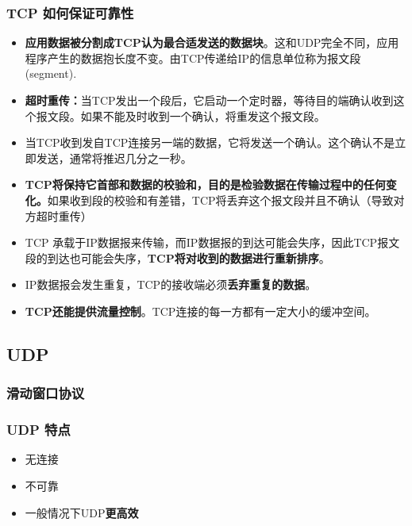 \documentclass[UTF8,a4paper,8pt]{ctexbook}
\begin{document}
			\subsubsection{TCP 如何保证可靠性}
				\begin{itemize}
					\item \textbf{应用数据被分割成TCP认为最合适发送的数据块}。这和UDP完全不同，应用程序产生的数据抱长度不变。由TCP传递给IP的信息单位称为报文段(segment).
					
					\item \textbf{超时重传：}当TCP发出一个段后，它启动一个定时器，等待目的端确认收到这个报文段。如果不能及时收到一个确认，将重发这个报文段。
					
					\item 当TCP收到发自TCP连接另一端的数据，它将发送一个确认。这个确认不是立即发送，通常将推迟几分之一秒。
					
					\item \textbf{TCP将保持它首部和数据的校验和，目的是检验数据在传输过程中的任何变化。}如果收到段的校验和有差错，TCP将丢弃这个报文段并且不确认（导致对方超时重传） 
					
					\item TCP 承载于IP数据报来传输，而IP数据报的到达可能会失序，因此TCP报文段的到达也可能会失序，\textbf{TCP将对收到的数据进行重新排序}。
					
					\item IP数据报会发生重复，TCP的接收端必须\textbf{丢弃重复的数据}。
					
					\item \textbf{TCP还能提供流量控制}。TCP连接的每一方都有一定大小的缓冲空间。
				\end{itemize}
		
		\subsection{UDP}
			\subsubsection{滑动窗口协议}
			
			\subsubsection{UDP 特点}
				\begin{itemize}
					\item 无连接
					\item 不可靠
					\item 一般情况下UDP\textbf{更高效}
				\end{itemize}
\end{document}
